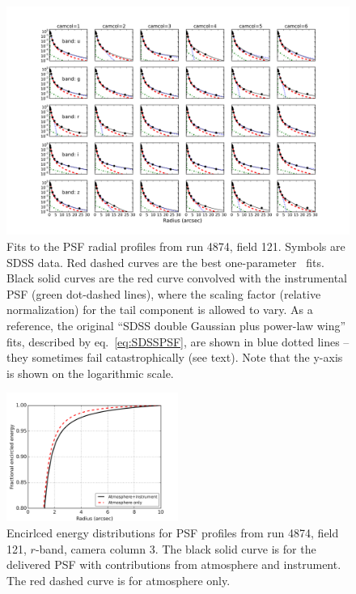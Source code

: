 \begin{figure}[th]
\centering
\includegraphics[width=1.0\textwidth]{FIGURES/psffit.png}
\vskip -0.3in
\caption{Fits to the PSF radial profiles from run 4874, field 121. Symbols are SDSS data. 
  Red dashed curves are the best one-parameter \vk~fits. Black solid curves are the red
  curve convolved with the instrumental PSF (green dot-dashed lines), where the scaling factor
  (relative normalization) 
  for the tail component is allowed to vary. 
As a reference, the original ``SDSS double Gaussian plus power-law wing'' fits,
described by eq.~\ref{eq:SDSSPSF}, 
 are shown in blue dotted lines -- they sometimes fail catastrophically (see text). 
Note that the y-axis is shown on the logarithmic scale.
\label{fig:psffit}}
\end{figure}


\begin{figure}[th]
\centering
\includegraphics[width=0.5\textwidth]{FIGURES/photometry.png}
\caption{Encirlced energy distributions for PSF profiles from run
  4874, field 121, $r$-band, camera column 3. The black solid curve is
  for the delivered PSF with contributions from atmosphere and
  instrument.
The red dashed curve is for atmosphere only.
\label{fig:ee}}
\end{figure}
